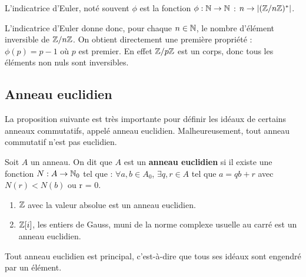 \begin{definition}
	L'indicatrice d'Euler, noté souvent $\phi$ est la fonction
	$\phi : \mathbb{N} \rightarrow \mathbb{N}$ : $n \rightarrow
	|(\mathbb{Z}/n\mathbb{Z})^{*}|$.
\end{definition}

L'indicatrice d'Euler donne donc, pour chaque $n \in \mathbb{N}$, le nombre
d'élément inversible de $\mathbb{Z}/n\mathbb{Z}$.
On obtient directement une première propriété : $\phi(p) = p - 1$ où $p$ est
premier. En effet $\mathbb{Z}/p\mathbb{Z}$ est un corps, donc tous les éléments non
nuls sont inversibles.




\subsection{Anneau euclidien}

La proposition suivante est très importante pour définir les idéaux de certains
anneaux commutatifs, appelé anneau euclidien. Malheureusement, tout anneau
commutatif n'est pas euclidien.

\begin{definition} 
	Soit $A$ un anneau. On dit que $A$ est un \textbf{anneau euclidien} si il existe
	une fonction $N : A \rightarrow \mathbb{N}_{0}$ tel que : $\forall a, b \in
	A_{0}$, $\exists q, r \in A$ tel que $a = qb + r$ avec $N(r) < N(b)$ ou r =
	0.
	\label{euclidian_ring}
\end{definition}

\begin{exemple}
	\begin{enumerate}
		\item $\mathbb{Z}$ avec la valeur absolue est un anneau euclidien.
		\item $\mathbb{Z}[i]$, les entiers de Gauss, muni de la norme complexe
			usuelle au carré est un anneau euclidien.
	\end{enumerate}
\end{exemple}

\begin{proposition}
	Tout anneau euclidien est principal, c'est-à-dire que tous ses idéaux sont
	engendré par un élément.
	\label{euclidian_implies_principal}
\end{proposition}

